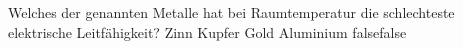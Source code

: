     {Welches der genannten Metalle hat bei Raumtemperatur die schlechteste elektrische Leitfähigkeit?}
    {Zinn}
    {Kupfer}
    {Gold}
    {Aluminium}
    {false}{false}